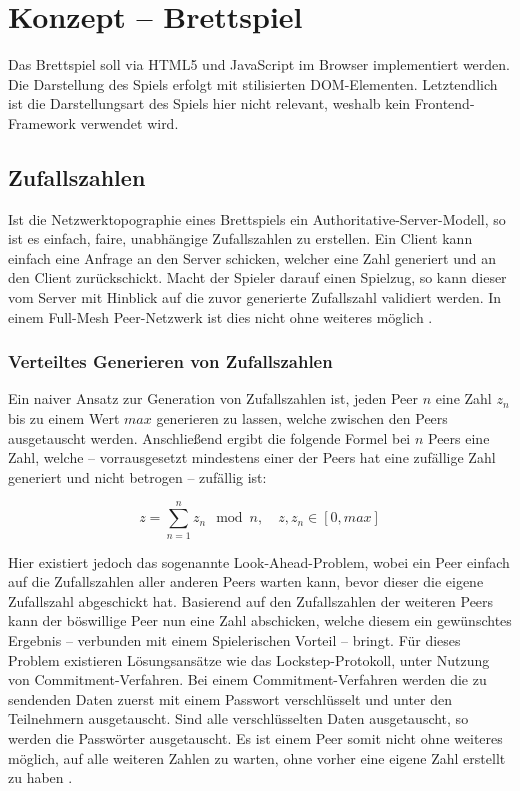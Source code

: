 \section{Konzept -- Brettspiel}
Das Brettspiel soll via HTML5 und JavaScript im Browser implementiert werden. Die Darstellung des Spiels erfolgt mit stilisierten DOM-Elementen. Letztendlich ist die Darstellungsart des Spiels hier nicht relevant, weshalb kein Frontend-Framework verwendet wird.\par

\subsection{Zufallszahlen}
Ist die Netzwerktopographie eines Brettspiels ein Authoritative-Server-Modell, so ist es einfach, faire, unabhängige Zufallszahlen zu erstellen. Ein Client kann einfach eine Anfrage an den Server schicken, welcher eine Zahl generiert und an den Client zurückschickt. Macht der Spieler darauf einen Spielzug, so kann dieser vom Server mit Hinblick auf die zuvor generierte Zufallszahl validiert werden. In einem Full-Mesh Peer-Netzwerk ist dies nicht ohne weiteres möglich \cite{rng}.\par

\subsubsection{Verteiltes Generieren von Zufallszahlen}
Ein naiver Ansatz zur Generation von Zufallszahlen ist, jeden Peer $n$ eine Zahl $z_n$ bis zu einem Wert $max$ generieren zu lassen, welche zwischen den Peers ausgetauscht werden. Anschließend ergibt die folgende Formel bei $n$ Peers eine Zahl, welche -- vorrausgesetzt mindestens einer der Peers hat eine zufällige Zahl generiert und nicht betrogen \cite{rng} -- zufällig ist:

\vspace{-20pt}
\[ z = \sum_{n=1}^{n} z_n \mod n,\quad z, z_n \in [0, max] \]
\vspace{-20pt}

Hier existiert jedoch das sogenannte \glqq{}Look-Ahead-Problem\grqq{}, wobei ein Peer einfach auf die Zufallszahlen aller anderen Peers warten kann, bevor dieser die eigene Zufallszahl abgeschickt hat. Basierend auf den Zufallszahlen der weiteren Peers kann der böswillige Peer nun eine Zahl abschicken, welche diesem ein gewünschtes Ergebnis -- verbunden mit einem Spielerischen Vorteil -- bringt. Für dieses Problem existieren Lösungsansätze wie das \glqq{}Lockstep-Protokoll\grqq{}, unter Nutzung von Commitment-Verfahren. Bei einem Commitment-Verfahren werden die zu sendenden Daten zuerst mit einem Passwort verschlüsselt und unter den Teilnehmern ausgetauscht. Sind alle verschlüsselten Daten ausgetauscht, so werden die Passwörter ausgetauscht. Es ist einem Peer somit nicht ohne weiteres möglich, auf alle weiteren Zahlen zu warten, ohne vorher eine eigene Zahl erstellt zu haben \cite{rng}.\par


